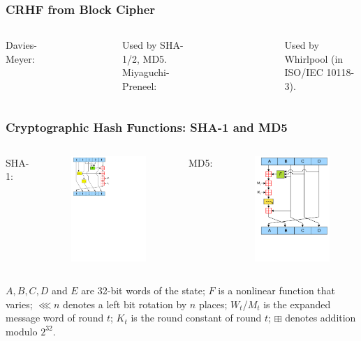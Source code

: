 \begin{frame}\frametitle{CRHF from Block Cipher}
\begin{columns}
Davies-Meyer:
\begin{figure}
\begin{center}

\end{center}
\end{figure}
Used by SHA-1/2, MD5.
Miyaguchi-Preneel:
\begin{figure}
\begin{center}

\end{center}
\end{figure}
Used by Whirlpool (in ISO/IEC 10118-3).
\end{columns}
\end{frame}
\begin{frame}\frametitle{Cryptographic Hash Functions: SHA-1 and MD5}
\begin{columns}[C]
SHA-1:
\begin{figure}
\begin{center}
\includegraphics[width=50mm]{pic/SHA1}
\end{center}
\end{figure}
MD5:
\begin{figure}
\begin{center}
\includegraphics[width=50mm]{pic/MD5}
\end{center}
\end{figure}
\end{columns}
$A, B, C, D$ and $E$ are 32-bit words of the state;
$F$ is a nonlinear function that varies;
$\lll n$ denotes a left bit rotation by $n$ places;
$W_t$/$M_t$ is the expanded message word of round $t$;
$K_t$ is the round constant of round $t$;
$\boxplus$ denotes addition modulo $2^{32}$.
\end{frame}
